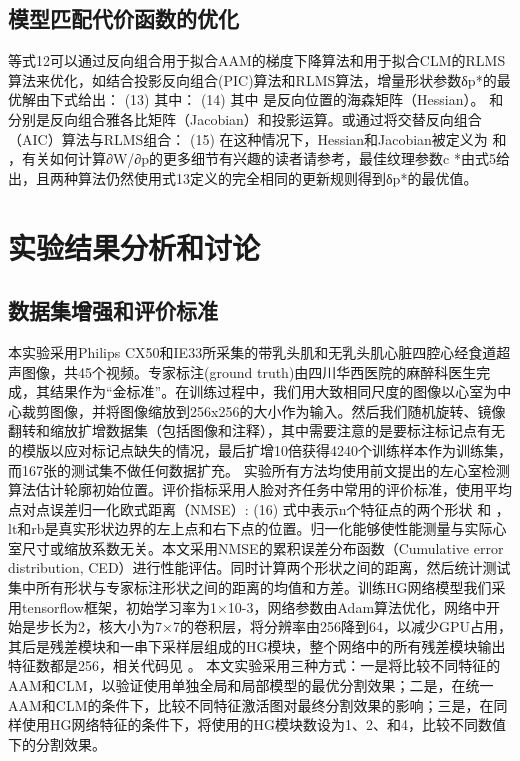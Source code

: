 \subsection{模型匹配代价函数的优化} 
等式12可以通过反向组合用于拟合AAM的梯度下降算法和用于拟合CLM的RLMS算法来优化，如结合投影反向组合(PIC)算法\citep{Jan2017}和RLMS算法，增量形状参数δp*的最优解由下式给出：
	  	(13)
其中：
	  	(14)
其中  是反向位置的海森矩阵（Hessian）。  和  分别是反向组合雅各比矩阵（Jacobian）和投影运算。或通过将交替反向组合（AIC）算法\citep{Jan2017}与RLMS组合：
 (15)
在这种情况下，Hessian和Jacobian被定义为  和  ，有关如何计算∂W/∂p的更多细节有兴趣的读者请参考\citep{Jan2017}，最佳纹理参数c *由式5给出，且两种算法仍然使用式13定义的完全相同的更新规则得到δp*的最优值。

\section{实验结果分析和讨论}
\subsection{数据集增强和评价标准}

本实验采用Philips CX50和IE33所采集的带乳头肌和无乳头肌心脏四腔心经食道超声图像，共45个视频。专家标注(ground truth)由四川华西医院的麻醉科医生完成，其结果作为“金标准”。在训练过程中，我们用大致相同尺度的图像以心室为中心裁剪图像，并将图像缩放到256x256的大小作为输入。然后我们随机旋转、镜像翻转和缩放扩增数据集（包括图像和注释），其中需要注意的是要标注标记点有无的模版以应对标记点缺失的情况，最后扩增10倍获得4240个训练样本作为训练集，而167张的测试集不做任何数据扩充。
实验所有方法均使用前文提出的左心室检测算法估计轮廓初始位置。评价指标采用人脸对齐任务中常用的评价标准，使用平均点对点误差归一化欧式距离（NMSE）:
	  	(16)
式中表示n个特征点的两个形状 和 ，lt和rb是真实形状边界的左上点和右下点的位置。归一化能够使性能测量与实际心室尺寸或缩放系数无关。本文采用NMSE的累积误差分布函数（Cumulative error distribution, CED）进行性能评估。同时计算两个形状之间的距离，然后统计测试集中所有形状与专家标注形状之间的距离的均值和方差。训练HG网络模型我们采用tensorflow框架，初始学习率为1×10-3，网络参数由Adam算法\citep{Kingma2014}优化，网络中开始是步长为2，核大小为7×7的卷积层，将分辨率由256降到64，以减少GPU占用，其后是残差模块和一串下采样层组成的HG模块，整个网络中的所有残差模块输出特征数都是256，相关代码见 。
本文实验采用三种方式：一是将比较不同特征的AAM和CLM，以验证使用单独全局和局部模型的最优分割效果；二是，在统一AAM和CLM的条件下，比较不同特征激活图对最终分割效果的影响；三是，在同样使用HG网络特征的条件下，将使用的HG模块数设为1、2、和4，比较不同数值下的分割效果。

